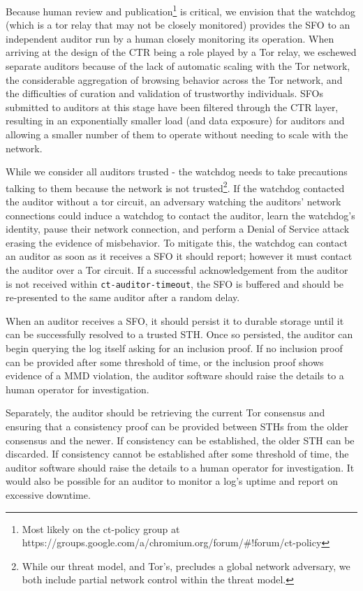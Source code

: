 Because human review and publication\footnote{Most likely on the ct-policy group at https://groups.google.com/a/chromium.org/forum/#!forum/ct-policy} is critical, we envision that the watchdog (which is a tor relay that may not be closely monitored) provides the SFO to an independent auditor run by a human closely monitoring its operation. When arriving at the design of the CTR being a role played by a Tor relay, we eschewed separate auditors because of the lack of automatic scaling with the Tor network, the considerable aggregation of browsing behavior across the Tor network, and the difficulties of curation and validation of trustworthy individuals. SFOs submitted to auditors at this stage have been filtered through the CTR layer, resulting in an exponentially smaller load (and data exposure) for auditors and allowing a smaller number of them to operate without needing to scale with the network.

While we consider all auditors trusted - the watchdog needs to take precautions talking to them because the network is not trusted\footnote{While our threat model, and Tor's, precludes a global network adversary, we both include partial network control within the threat model.}. If the watchdog contacted the auditor without a tor circuit, an adversary watching the auditors' network connections could induce a watchdog to contact the auditor, learn the watchdog's identity, pause their network connection, and perform a Denial of Service attack erasing the evidence of misbehavior. To mitigate this, the watchdog can contact an auditor as soon as it receives a SFO it should report; however it must contact the auditor over a Tor circuit. If a successful acknowledgement from the auditor is not received within \texttt{ct-auditor-timeout}, the SFO is buffered and should be re-presented to the same auditor after a random delay.

When an auditor receives a SFO, it should persist it to durable storage until it can be successfully resolved to a trusted STH. Once so persisted, the auditor can begin querying the log itself asking for an inclusion proof. If no inclusion proof can be provided after some threshold of time, or the inclusion proof shows evidence of a MMD violation, the auditor software should raise the details to a human operator for investigation.

Separately, the auditor should be retrieving the current Tor consensus and ensuring that a consistency proof can be provided between STHs from the older consensus and the newer. If consistency can be established, the older STH can be discarded. If consistency cannot be established after some threshold of time, the auditor software should raise the details to a human operator for investigation. It would also be possible for an auditor to monitor a log's uptime and report on excessive downtime.


